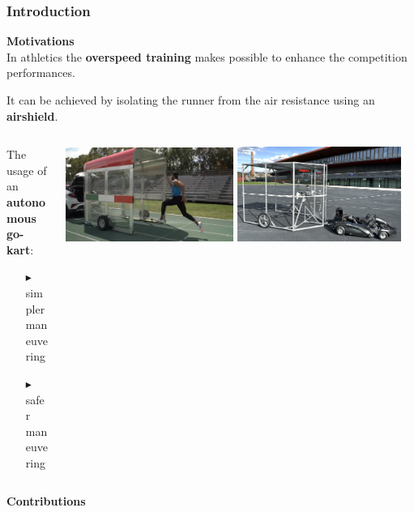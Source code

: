 \documentclass[11pt, aspectratio=169]{beamer}
\begin{document}

\begin{frame}[t]
\frametitle{Introduction}
\vspace{0.1cm}
\textcolor{emph@Thesis}{\textbf{\small{Motivations}}} \\
\vspace{0.1cm}
In athletics the \textbf{overspeed training} makes possible to enhance the competition performances.

It can be achieved by isolating the runner from the air resistance using an \textbf{airshield}.

\begin{columns}
\hspace{0.2cm}
\begin{column}{0.4\textwidth}
The usage of an \textbf{autonomous go-kart}:
	\begin{itemize}
		\item[$\blacktriangleright$] simpler maneuvering
		\item[$\blacktriangleright$] safer maneuvering
	\end{itemize}
\end{column}
\begin{column}{0.6\textwidth}
	\begin{center}
  		\includegraphics[width=0.48\textwidth]{Jacobs} 
		\includegraphics[width=0.47\textwidth]{Windshield} 
	\end{center}
\end{column}
\end{columns}
\vspace{0.1cm}

\vspace{0.1cm}
\textcolor{emph@Thesis}{\textbf{\small{Contributions}}} \\
\vspace{0.1cm}

\end{frame}
\end{document}
